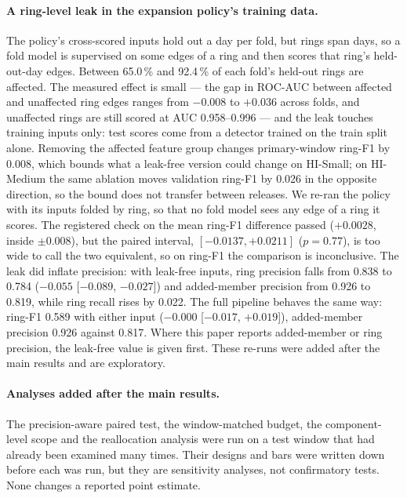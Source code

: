\paragraph{A ring-level leak in the expansion policy's training data.}
The policy's cross-scored inputs hold out a day per fold, but rings span days, so a fold model
is supervised on some edges of a ring and then scores that ring's held-out-day edges. Between
65.0\,\% and 92.4\,\% of each fold's held-out rings are affected. The measured effect is small
--- the gap in ROC-AUC between affected and unaffected ring edges ranges from $-0.008$ to
$+0.036$ across folds, and unaffected rings are still scored at AUC 0.958--0.996 --- and the
leak touches training inputs only: test scores come from a detector trained on the train
split alone. Removing the affected feature group changes primary-window ring-F1 by 0.008,
which bounds what a leak-free version could change on HI-Small; on HI-Medium the same ablation
moves validation ring-F1 by 0.026 in the opposite direction, so the bound does not transfer
between releases.
We re-ran the policy with its inputs folded by ring, so that no fold model sees any edge of a
ring it scores. The registered check on the mean ring-F1 difference passed ($+0.0028$, inside
$\pm 0.008$), but the paired interval, $[-0.0137, +0.0211]$ ($p=0.77$), is too wide to call the
two equivalent, so on ring-F1 the comparison is inconclusive. The leak did inflate precision:
with leak-free inputs, ring precision falls from 0.838 to 0.784 ($-0.055$ [$-0.089$, $-0.027$])
and added-member precision from 0.926 to 0.819, while ring recall rises by 0.022. The full
pipeline behaves the same way: ring-F1 0.589 with either input ($-0.000$ [$-0.017$, $+0.019$]),
added-member precision 0.926 against 0.817. Where this paper reports added-member or ring
precision, the leak-free value is given first. These re-runs were added after the main results
and are exploratory.

\paragraph{Analyses added after the main results.}
The precision-aware paired test, the window-matched budget, the component-level scope and the
reallocation analysis were run on a test window that had already been examined many times.
Their designs and bars were written down before each was run, but they are sensitivity
analyses, not confirmatory tests. None changes a reported point estimate.

